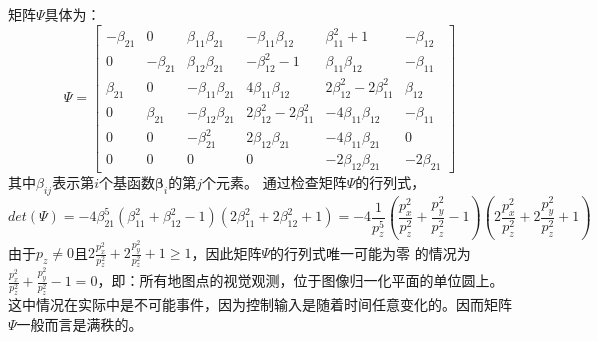 \documentclass{article}
\begin{document}
\par
矩阵$\Psi$具体为：
\begin{equation}
\Psi=\left[\begin{array}{cccccc} 
    -\beta_{21}&0&\beta_{11}\beta_{21}&-\beta_{11}\beta_{12}&\beta_{11}^{2}+1&-\beta_{12}\\
    0&-\beta_{21}&\beta_{12}\beta_{21}&-\beta_{12}^{2}-1&\beta_{11}\beta_{12}&-\beta_{11}\\
    \beta_{21}&0&-\beta_{11}\beta_{21}&4\beta_{11}\beta_{12}&2\beta_{12}^{2}-2\beta_{11}^{2}&\beta_{12}\\
    0&\beta_{21}&-\beta_{12}\beta_{21}&2\beta_{12}^{2}-2\beta_{11}^{2}&-4\beta_{11}\beta_{12}&-\beta_{11}\\
    0&0&-\beta_{21}^{2}&2\beta_{12}\beta_{21}&-4\beta_{11}\beta_{21}&0\\
    0&0&0&0&-2\beta_{12}\beta_{21}&-2\beta_{21}
\end{array}\right]
\end{equation}
其中$\beta_{ij}$表示第$i$个基函数$\mathbf{\beta}_i$的第$j$个元素。
通过检查矩阵$\Psi$的行列式，
\begin{equation}
    det(\Psi)=-4\beta_{21}^{5}(\beta_{11}^{2}+\beta_{12}^{2}-1)(2\beta_{11}^{2}+2\beta_{12}^{2}+1)
    =-4\frac{1}{p_z^5}(\frac{p_x^2}{p_z^2}+\frac{p_y^2}{p_z^2}-1)(2\frac{p_x^2}{p_z^2}+2\frac{p_y^2}{p_z^2}+1)
\end{equation}
由于$p_z\not=0$且$2\frac{p_x^2}{p_z^2}+2\frac{p_y^2}{p_z^2}+1\geqslant 1$，因此矩阵$\Psi$的行列式唯一可能为零
的情况为$\frac{p_x^2}{p_z^2}+\frac{p_y^2}{p_z^2}-1=0$，即：所有地图点的视觉观测，位于图像归一化平面的单位圆上。
这中情况在实际中是不可能事件，因为控制输入是随着时间任意变化的。因而矩阵$\Psi$一般而言是满秩的。
\end{document}
